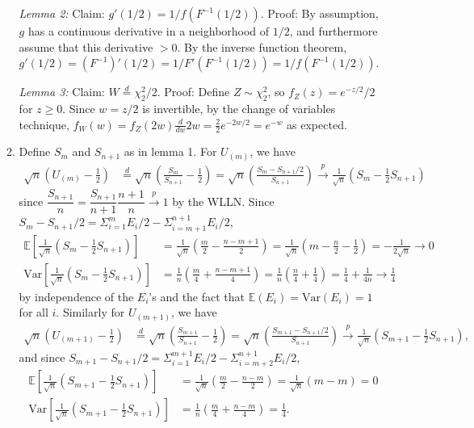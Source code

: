 \documentclass[12pt]{article}
\newcommand{\E}{\mathbb{E}}
\newcommand{\V}{\text{Var}}
\begin{document}
\begin{enumerate}
\begin{enumerate}
        \textit{Lemma 2:} Claim: $g'(1/2) = 1/f(F^{-1}(1/2))$. Proof: By assumption, $g$ has a continuous derivative in a neighborhood of $1/2$, and furthermore assume that this derivative $>0$. By the inverse function theorem, $g'(1/2) = (F^{-1})'(1/2) = 1/F'(F^{-1}(1/2)) = 1/f(F^{-1}(1/2))$.

        \textit{Lemma 3:} Claim: $W \overset{d}{=} \chi^2_2/2$. Proof: Define $Z \sim \chi^2_2$, so $f_Z(z) = e^{-z/2}/2$ for $z \geq 0$. Since $w = z/2$ is invertible, by the change of variables technique, $f_W(w) = f_Z(2w)\frac{d}{dw}2w = \frac{2}{2}e^{-2w/2} = e^{-w}$ as expected.
        \item Define $S_m$ and $S_{n+1}$ as in lemma 1. For $U_{(m)}$, we have \begin{align*}
            \sqrt{n}(U_{(m)}-\frac{1}{2}) &\overset{d}{=} \sqrt{n}(\frac{S_m}{S_{n+1}}-\frac{1}{2}) = \sqrt{n}(\frac{S_m-S_{n+1}/2}{S_{n+1}}) \overset{p}{\to} \frac{1}{\sqrt{n}}(S_m-\frac{1}{2}S_{n+1})
        \end{align*} since $\dfrac{S_{n+1}}{n} = \dfrac{S_{n+1}}{n+1}\dfrac{n+1}{n} \overset{p}{\to} 1$ by the WLLN. Since $S_m - S_{n+1}/2 = \Sigma_{i=1}^m E_i/2 - \Sigma_{i=m+1}^{n+1} E_i/2$, \begin{align*}
            \E[\frac{1}{\sqrt{n}}(S_m-\frac{1}{2}S_{n+1})] &= \frac{1}{\sqrt{n}}(\frac{m}{2}-\frac{n-m+1}{2}) = \frac{1}{\sqrt{n}}(m-\frac{n}{2}-\frac{1}{2}) = -\frac{1}{2\sqrt{n}} \to 0\\
            \V[\frac{1}{\sqrt{n}}(S_m-\frac{1}{2}S_{n+1})] &= \frac{1}{n}(\frac{m}{4}+\frac{n-m+1}{4}) = \frac{1}{n}(\frac{n}{4}+\frac{1}{4}) = \frac{1}{4} + \frac{1}{4n} \to \frac{1}{4}
        \end{align*} by independence of the $E_i$'s and the fact that $\E(E_i) = \V(E_i) = 1$ for all $i$. Similarly for $U_{(m+1)}$, we have \begin{align*}
            \sqrt{n}(U_{(m+1)}-\frac{1}{2}) &\overset{d}{=} \sqrt{n}(\frac{S_{m+1}}{S_{n+1}}-\frac{1}{2}) = \sqrt{n}(\frac{S_{m+1}-S_{n+1}/2}{S_{n+1}}) \overset{p}{\to} \frac{1}{\sqrt{n}}(S_{m+1}-\frac{1}{2}S_{n+1}),
        \end{align*} and since $S_{m+1} - S_{n+1}/2 = \Sigma_{i=1}^{m+1} E_i/2 - \Sigma_{i=m+2}^{n+1} E_i/2$, \begin{align*}
            \E[\frac{1}{\sqrt{n}}(S_{m+1}-\frac{1}{2}S_{n+1})] &= \frac{1}{\sqrt{n}}(\frac{m}{2}-\frac{n-m}{2}) = \frac{1}{\sqrt{n}}(m-m) = 0\\
            \V[\frac{1}{\sqrt{n}}(S_{m+1}-\frac{1}{2}S_{n+1})] &= \frac{1}{n}(\frac{m}{4}+\frac{n-m}{4}) = \frac{1}{4}.
        \end{align*}


\end{enumerate}
\end{enumerate}
\end{document}
